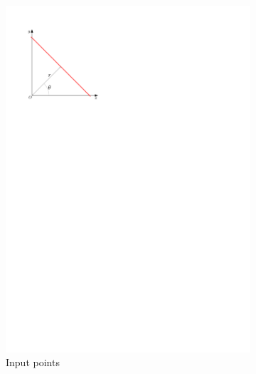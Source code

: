 \begin{figure}[htb]
\begin{subfigure}[b]{0.3\linewidth}
	\end{subfigure}
	\quad
	\begin{subfigure}[b]{0.3\linewidth}
		\centering
		\includegraphics[width=\textwidth,page=2]{figs/hough-transform.pdf}
		\caption{Input points}
		\label{fig:hough-transform:b}
	\end{subfigure}
	\quad
	\begin{subfigure}[b]{0.3\linewidth}
		\centering

\end{subfigure}
\end{figure}
